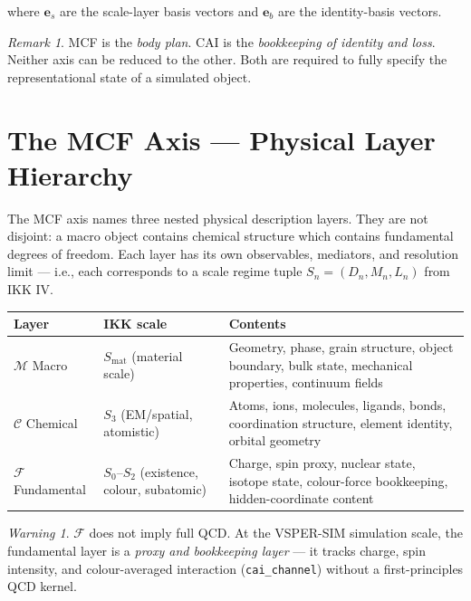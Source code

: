 \documentclass[11pt, a4paper, oneside]{article}
\theoremstyle{definition}
\theoremstyle{plain}
\theoremstyle{remark}
\newtheorem{remark}{Remark}[section]
\newtheorem{warning}{Warning}[section]
\newcommand{\Macro}{\mathscr{M}}          %
\newcommand{\Chem}{\mathscr{C}}           %
\newcommand{\Fund}{\mathscr{F}}           %
\begin{document}
where $\mathbf{e}_s$ are the scale-layer basis vectors and $\mathbf{e}_b$ are the
identity-basis vectors.

\begin{remark}
  MCF is the \emph{body plan}. CAI is the \emph{bookkeeping of identity and loss}.
  Neither axis can be reduced to the other. Both are required to fully specify
  the representational state of a simulated object.
\end{remark}

\section{The MCF Axis --- Physical Layer Hierarchy}

The MCF axis names three nested physical description layers. They are not disjoint:
a macro object contains chemical structure which contains fundamental degrees of
freedom. Each layer has its own observables, mediators, and resolution limit ---
i.e., each corresponds to a scale regime tuple $S_n = (D_n, M_n, L_n)$ from IKK IV.

\begin{longtable}{p{2cm} p{4cm} p{7cm}}
  \toprule
  \textbf{Layer} & \textbf{IKK scale} & \textbf{Contents} \\
  \midrule
  \rowcolor{MacroBG}
  $\Macro$ \quad Macro &
  $S_{\mathrm{mat}}$ (material scale) &
  Geometry, phase, grain structure, object boundary, bulk state,
  mechanical properties, continuum fields \\[4pt]
  \rowcolor{ChemBG}
  $\Chem$ \quad Chemical &
  $S_3$ (EM/spatial, atomistic) &
  Atoms, ions, molecules, ligands, bonds, coordination structure,
  element identity, orbital geometry \\[4pt]
  \rowcolor{FundBG}
  $\Fund$ \quad Fundamental &
  $S_0$--$S_2$ (existence, colour, subatomic) &
  Charge, spin proxy, nuclear state, isotope state, colour-force
  bookkeeping, hidden-coordinate content \\
  \bottomrule
\end{longtable}

\begin{warning}
  $\Fund$ does not imply full QCD. At the VSPER-SIM simulation scale,
  the fundamental layer is a \emph{proxy and bookkeeping layer} --- it tracks
  charge, spin intensity, and colour-averaged interaction (\texttt{cai\_channel})
  without a first-principles QCD kernel.
\end{warning}
\end{document}
